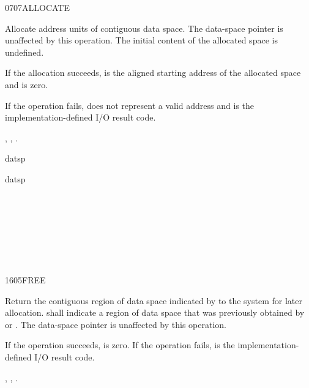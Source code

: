 \begin{worddef}{0707}{ALLOCATE}
\item {}

	Allocate  address units of contiguous data space. The
	data-space pointer is unaffected by this operation. The initial
	content of the allocated space is undefined.

	If the allocation succeeds,  is the aligned
	starting address of the allocated space and  is
	zero.

	If the operation fails,  does not represent a valid
	address and  is the {im\-ple\-ment\-ation-de\-fin\-ed} I/O result
	code.

\see {},
	,
	.

	\begin{testing}
		\ttfamily
		 datsp

		 datsp \word{!} \\
		 \\
						\tab {}  \\
											\tab[5]  \\

		 \\
		 \tab {}  \\

		 \\
		 \tab {} 
	\end{testing}
\end{worddef}


\begin{worddef}{1605}{FREE}
\item {}

	Return the contiguous region of data space indicated by
	 to the system for later allocation. 
	shall indicate a region of data space that was previously
	obtained by  or . The data-space
	pointer is unaffected by this operation.

	If the operation succeeds,  is zero. If the operation
	fails,  is the implementation-defined I/O result code.

\see {},
	,
	.
\end{worddef}


